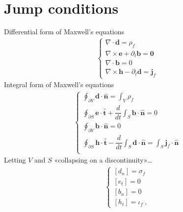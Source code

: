 \documentclass[letterpaper,10pt,italian]{jupyterBook}
\begin{document}
\section{Jump conditions}
\label{\detokenize{ch/media:jump-conditions}}\label{\detokenize{ch/media:classical-electromagnetism-media-jump}}
\sphinxAtStartPar
Differential form of Maxwell’s equations
\begin{equation*}
\begin{split}\begin{cases}
 \nabla \cdot \mathbf{d} = \rho_f \\
 \nabla \times \mathbf{e} + \partial_t \mathbf{b} = \mathbf{0} \\
 \nabla \cdot \mathbf{b} = 0 \\
 \nabla \times \mathbf{h} - \partial_t \mathbf{d} = \mathbf{j}_f
\end{cases}\end{split}
\end{equation*}
\sphinxAtStartPar
Integral form of Maxwell’s equations
\begin{equation*}
\begin{split}\begin{cases}
 \displaystyle \oint_{\partial V} \mathbf{d} \cdot \hat{\mathbf{n}} = \int_{V} \rho_f \\
 \displaystyle \oint_{\partial S} \mathbf{e} \cdot \hat{\mathbf{t}} + \dfrac{d}{dt} \int_S \mathbf{b} \cdot \hat{\mathbf{n}} = 0 \\
 \displaystyle \oint_{\partial V} \mathbf{b} \cdot \hat{\mathbf{n}} = 0 \\
 \displaystyle \oint_{\partial S} \mathbf{h} \cdot \hat{\mathbf{t}} - \dfrac{d}{dt} \int_S \mathbf{d} \cdot \hat{\mathbf{n}} = \int_{S} \mathbf{j}_f \cdot \hat{\mathbf{n}} \\
\end{cases}\end{split}
\end{equation*}
\sphinxAtStartPar
Letting \(V\) and \(S\) «collapsing on a discontinuity»…
\begin{equation}\label{equation:ch/media:eq:em-jump}
\begin{split}\begin{cases}
  [ d_n ] = \sigma_f \\
  [ e_t ] = 0 \\
  [ b_n ] = 0 \\
  [ h_t ] = \iota_f \ ,
\end{cases}\end{split}
\end{equation}
\end{document}
